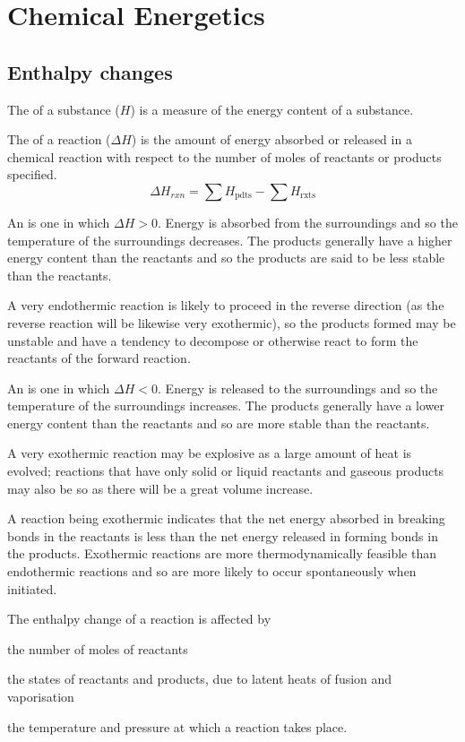 \documentclass[Chemistry.tex]{subfiles}
\begin{document}
\chapter{Chemical Energetics}
\section{Enthalpy changes}
The  of a substance (\(H\)) is a measure of the energy content of a substance.

The  of a reaction (\(\Delta H\)) is the amount of energy absorbed or released in a chemical reaction with respect to the number of moles of reactants or products specified. \begin{equation}\Delta H_{rxn} = \sum H_\text{pdts} - \sum H_\text{rxts}\end{equation}

An  is one in which \(\Delta H > 0\). Energy is absorbed from the surroundings and so the temperature of the surroundings decreases. The products generally have a higher energy content than the reactants and so the products are said to be less stable than the reactants.

A very endothermic reaction is likely to proceed in the reverse direction (as the reverse reaction will be likewise very exothermic), so the products formed may be unstable and have a tendency to decompose or otherwise react to form the reactants of the forward reaction.

An  is one in which \(\Delta H < 0\). Energy is released to the surroundings and so the temperature of the surroundings increases. The products generally have a lower energy content than the reactants and so are more stable than the reactants.

A very exothermic reaction may be explosive as a large amount of heat is evolved; reactions that have only solid or liquid reactants and gaseous products may also be so as there will be a great volume increase.

A reaction being exothermic indicates that the net energy absorbed in breaking bonds in the reactants is less than the net energy released in forming bonds in the products. Exothermic reactions are more thermodynamically feasible than endothermic reactions and so are more likely to occur spontaneously when initiated.

The enthalpy change of a reaction is affected by \begin{slinenum}
\item the number of moles of reactants
\item the states of reactants and products, due to latent heats of fusion and vaporisation
\item the temperature and pressure at which a reaction takes place.
\end{slinenum}
\end{document}
